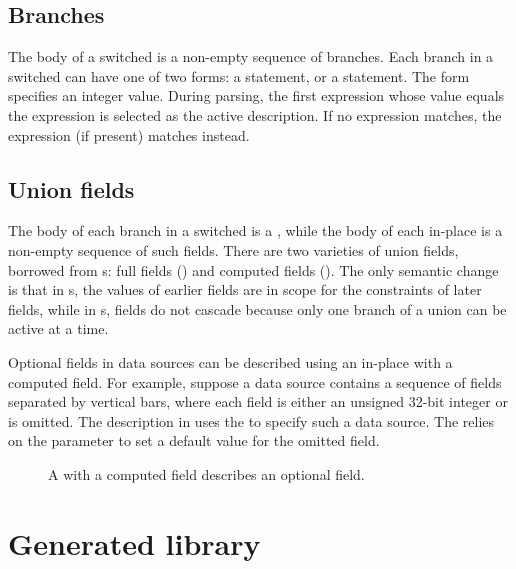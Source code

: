\subsection{Branches}
The body of a switched \Punion{} is a non-empty sequence of branches.
Each branch in a switched \Punion can have one of two forms: a
\Pcase{} statement, or a \Pdefault{} statement.  The \Pcase{} form
specifies an integer value.  During parsing, the first \Pcase{}
expression whose value equals the \Pswitch{} expression is selected as
the active description. If no \Pcase{} expression
matches, the \Pdefault{} expression (if present) matches instead.

\subsection{Union fields}
The body of each branch in a switched \Punion{} is a ,
while the body of each in-place \Punion{} is a non-empty sequence of
such fields. 
There are two varieties of union fields, borrowed from \Pstruct{}s: 
full fields () 
and computed fields ().  
The only semantic change is that in \Pstruct{}s, the values of earlier
fields are in scope for the constraints of later fields, while in
\Punion{}s, fields do not cascade because only one branch of a union
can be active at a time.  

Optional fields in data sources can be described using an in-place
\Punion{} with a computed field.  For example, suppose a data source
contains a sequence of fields separated by vertical bars, where each
field is either an unsigned 32-bit integer or is omitted.  The
description in  
uses the \Punion{}  to specify such a data source.
The  \Punion{} relies on the parameter  to set
a default value for the omitted field.

\begin{figure}

\caption{A \Punion{} with a computed field describes an optional field.}
\label{fig:union-option}
\end{figure}

\section{Generated library}
